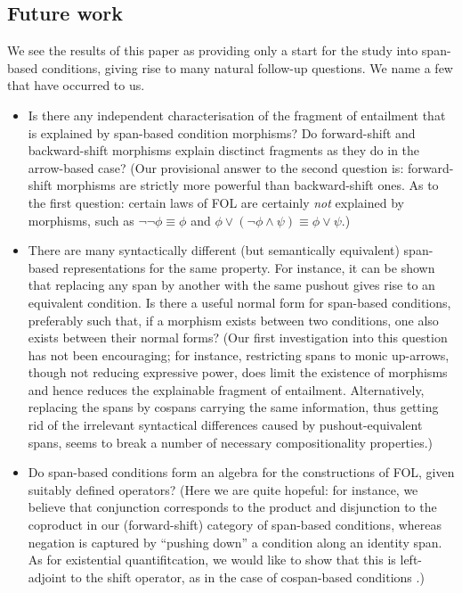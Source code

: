 \subsection{Future work}

We see the results of this paper as providing only a start for the study into span-based conditions, giving rise to many natural follow-up questions. We name a few that have occurred to us.
%
\begin{itemize}
\item Is there any independent characterisation of the fragment of entailment that is explained by span-based condition morphisms? Do forward-shift and backward-shift morphisms explain disctinct fragments as they do in the arrow-based case? (Our provisional answer to the second question is: forward-shift morphisms are strictly more powerful than backward-shift ones. As to the first question: certain laws of FOL are certainly \emph{not} explained by morphisms, such as $\neg\neg\phi\equiv \phi$ and $\phi\vee (\neg\phi\wedge\psi)\equiv \phi\vee\psi$.)

\item There are many syntactically different (but semantically equivalent) span-based representations for the same property. For instance, it can be shown that replacing any span by another with the same pushout gives rise to an equivalent condition. Is there a useful normal form for span-based conditions, preferably such that, if a morphism exists between two conditions, one also exists between their normal forms? (Our first investigation into this question has not been encouraging; for instance, restricting spans to monic up-arrows, though not reducing expressive power, does limit the existence of morphisms and hence reduces the explainable fragment of entailment. Alternatively, replacing the spans by cospans carrying the same information, thus getting rid of the irrelevant syntactical differences caused by pushout-equivalent spans, seems to break a number of necessary compositionality properties.)

\item Do span-based conditions form an algebra for the constructions of FOL, given suitably defined operators? (Here we are quite hopeful: for instance, we believe that conjunction corresponds to the product and disjunction to the coproduct in our (forward-shift) category of span-based conditions, whereas negation is captured by ``pushing down'' a condition along an identity span. As for existential quantifitcation, we would like to show that this is left-adjoint to the shift operator, as in the case of cospan-based conditions \cite{Konig}.)
\end{itemize}

